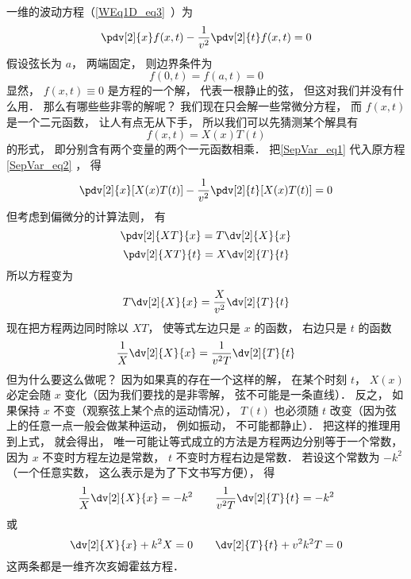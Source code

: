 一维的波动方程（\autoref{WEq1D_eq3}~）为
\begin{equation}
\pdv[2]{x} f(x, t) - \frac{1}{v^2} \pdv[2]{t}f(x, t) = 0
\end{equation}
假设弦长为 $a$， 两端固定， 则边界条件为
\begin{equation}\label{SepVar_eq3}
f(0, t) = f(a, t) = 0
\end{equation}
显然， $f(x, t) \equiv 0$ 是方程的一个解， 代表一根静止的弦， 但这对我们并没有什么用． 那么有哪些些非零的解呢？ 我们现在只会解一些常微分方程， 而 $f(x, t)$ 是一个二元函数， 让人有点无从下手， 所以我们可以先猜测某个解具有
\begin{equation}\label{SepVar_eq1}
f(x, t) = X(x) T(t)
\end{equation}
的形式， 即分别含有两个变量的两个一元函数相乘． 把\autoref{SepVar_eq1} 代入原方程\autoref{SepVar_eq2} ， 得
\begin{equation}
\pdv[2]{x}[X(x)T(t)] - \frac{1}{v^2}\pdv[2]{t} [X(x) T(t)] = 0
\end{equation}
但考虑到偏微分的计算法则， 有
\begin{equation}
\pdv[2]{XT}{x} = T \dv[2]{X}{x}
\end{equation}
\begin{equation}
\pdv[2]{XT}{t} = X \dv[2]{T}{t}
\end{equation}
所以方程变为
\begin{equation}
T\dv[2]{X}{x} = \frac{X}{v^2} \dv[2]{T}{t}
\end{equation}
现在把方程两边同时除以 $XT$， 使等式左边只是 $x$ 的函数， 右边只是 $t$ 的函数
\begin{equation}
\frac{1}{X}\dv[2]{X}{x} = \frac{1}{v^2 T} \dv[2]{T}{t}
\end{equation}
但为什么要这么做呢？ 因为如果真的存在一个这样的解， 在某个时刻 $t$， $X(x)$ 必定会随 $x$ 变化（因为我们要找的是非零解， 弦不可能是一条直线）． 反之， 如果保持 $x$ 不变（观察弦上某个点的运动情况）， $T(t)$ 也必须随 $t$ 改变（因为弦上的任意一点一般会做某种运动， 例如振动， 不可能都静止）． 把这样的推理用到上式， 就会得出， 唯一可能让等式成立的方法是方程两边分别等于一个常数， 因为 $x$ 不变时方程左边是常数，  $t$ 不变时方程右边是常数． 若设这个常数为 $-k^2$（一个任意实数， 这么表示是为了下文书写方便）， 得
\begin{equation}
\frac{1}{X}\dv[2]{X}{x} = -k^2
\qquad
\frac{1}{v^2 T}\dv[2]{T}{t} = -k^2
\end{equation}
或
\begin{equation}
\dv[2]{X}{x} + k^2 X = 0
\qquad
\dv[2]{T}{t} + v^2k^2 T = 0
\end{equation}
这两条都是一维齐次亥姆霍兹方程．

